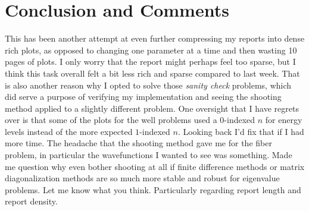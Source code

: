 \documentclass[10pt, titlepage, a4paper]{article}
\begin{document}
\section{Conclusion and Comments}
This has been another attempt at even further compressing my reports into dense rich plots, as opposed to changing one parameter at a time and then wasting 10 pages of plots. 
I only worry that the report might perhaps feel too sparse, but I think this task overall felt a bit less rich and sparse compared to last week. That is also another reason why I 
opted to solve those \textit{sanity check} problems, which did serve a purpose of verifying my implementation and seeing the shooting method applied to a slightly different problem.
One oversight that I have regrets over is that some of the plots for the well problems used a $0$-indexed $n$ for energy levels instead of the more expected $1$-indexed $n$. Looking back I'd 
fix that if I had more time. The headache that the shooting method gave me for the fiber problem, in particular the wavefunctions I wanted to see was something. Made me question why 
even bother shooting at all if finite difference methods or matrix diagonalization methods are so much more stable and robust for eigenvalue problems. Let me know what you think. Particularly 
regarding report length and report density.

% 
% 

\end{document}
